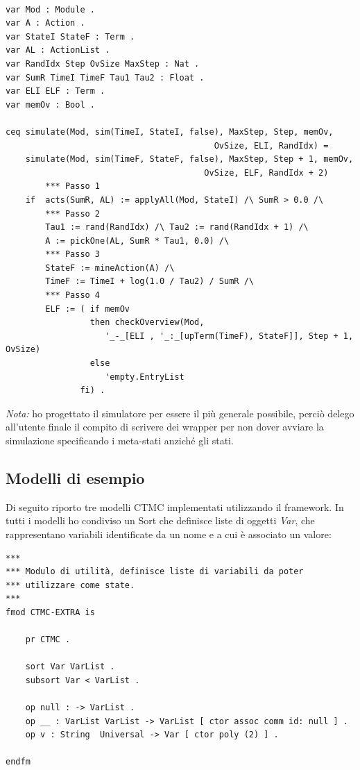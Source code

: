 \begin{Verbatim}[fontsize=\small]

var Mod : Module .
var A : Action .
var StateI StateF : Term .
var AL : ActionList .
var RandIdx Step OvSize MaxStep : Nat .
var SumR TimeI TimeF Tau1 Tau2 : Float .
var ELI ELF : Term .
var memOv : Bool .

ceq simulate(Mod, sim(TimeI, StateI, false), MaxStep, Step, memOv,
                                          OvSize, ELI, RandIdx) =
    simulate(Mod, sim(TimeF, StateF, false), MaxStep, Step + 1, memOv,
                                        OvSize, ELF, RandIdx + 2)
        *** Passo 1
    if  acts(SumR, AL) := applyAll(Mod, StateI) /\ SumR > 0.0 /\
        *** Passo 2
        Tau1 := rand(RandIdx) /\ Tau2 := rand(RandIdx + 1) /\
        A := pickOne(AL, SumR * Tau1, 0.0) /\
        *** Passo 3
        StateF := mineAction(A) /\
        TimeF := TimeI + log(1.0 / Tau2) / SumR /\
        *** Passo 4
        ELF := ( if memOv
                 then checkOverview(Mod,
                    '_-_[ELI , '_:_[upTerm(TimeF), StateF]], Step + 1, OvSize)
                 else
                    'empty.EntryList
               fi) .
\end{Verbatim}

\emph{Nota:} ho progettato il simulatore per essere il più generale possibile,
perciò delego all'utente finale il compito di scrivere dei wrapper per non dover
avviare la simulazione specificando i meta-stati anziché gli stati.

\subsection{Modelli di esempio}
\label{sec:esempio}

Di seguito riporto tre modelli CTMC implementati utilizzando il framework. In
tutti i modelli ho condiviso un Sort che definisce liste di oggetti \emph{Var},
che rappresentano variabili identificate da un nome e a cui è associato un
valore:
\begin{Verbatim}[fontsize=\small]
***
*** Modulo di utilità, definisce liste di variabili da poter
*** utilizzare come state.
***
fmod CTMC-EXTRA is
	
	pr CTMC .

	sort Var VarList .
	subsort Var < VarList .
	
	op null : -> VarList .
	op __ : VarList VarList -> VarList [ ctor assoc comm id: null ] .
	op v : String  Universal -> Var [ ctor poly (2) ] .

endfm
\end{Verbatim}

